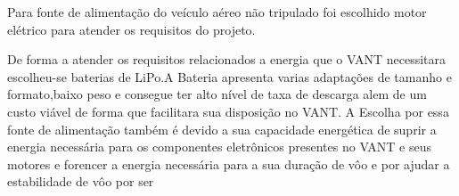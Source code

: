 Para fonte de alimentação do veículo aéreo não tripulado foi escolhido motor elétrico para atender os requisitos do projeto.

De forma a atender os requisitos relacionados a energia que o VANT necessitara escolheu-se baterias de  LiPo.A Bateria apresenta varias adaptações de tamanho e formato,baixo peso e consegue ter alto nível de taxa de descarga alem de um custo viável de forma que facilitara sua disposição no VANT. A Escolha por essa fonte de alimentação também é devido a sua capacidade energética de suprir a energia necessária para os componentes eletrônicos presentes no VANT e seus motores e forencer a energia necessária para a  sua duração de vôo e por ajudar a  estabilidade de vôo por ser
